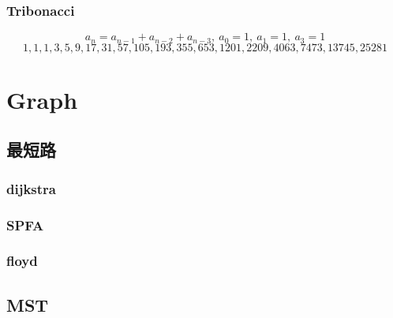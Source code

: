 \subsubsection{Tribonacci}
\[a_{n} = a_{n-1} + a_{n-2} + a_{n-3},\ a_0 = 1,\ a_1 = 1,\ a_3 = 1\]
\[1, 1, 1, 3, 5, 9, 17, 31, 57, 105, 193, 355, 653, 1201, 2209, 4063, 7473, 13745, 25281\]

% 

% 

% 

\section{Graph}

\subsection{最短路}
\subsubsection{dijkstra}


\subsubsection{SPFA}


\subsubsection{floyd}


\subsection{MST}
